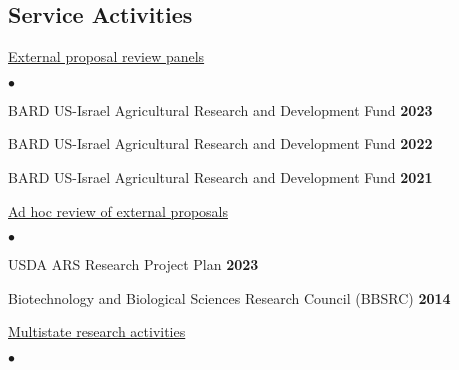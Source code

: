 \documentclass[margin,line,10pt]{res}
\newenvironment{list2}{
  \begin{list}{$\bullet$}{%
      \setlength{\itemsep}{0in}
      \setlength{\parsep}{0in} \setlength{\parskip}{0in}
      \setlength{\topsep}{0in} \setlength{\partopsep}{0in} 
      \setlength{\leftmargin}{0.2in}}}{\end{list}}
\begin{document}
\begin{resume}
\vspace{0.5cm}
\section{\sc Service Activities}


\begin{flushleft}
  \hspace{0.3cm} \underline{External proposal review panels}
  \end{flushleft}


  \begin{list2}
    \item BARD US-Israel Agricultural Research and Development Fund \hfill \textbf{2023}  \\
  
    \vspace{0.3cm}

    \item BARD US-Israel Agricultural Research and Development Fund \hfill \textbf{2022}  \\
  
    \vspace{0.3cm}

    \item BARD US-Israel Agricultural Research and Development Fund \hfill \textbf{2021}  \\
  
    \end{list2}



\begin{flushleft}
\hspace{0.3cm} \underline{Ad hoc review of external proposals}
\end{flushleft}

\begin{list2}

  \item USDA ARS Research Project Plan \hfill \textbf{2023}  \\

  \vspace{0.3cm}

\item  Biotechnology and Biological Sciences Research Council (BBSRC) \hfill \textbf{2014}  \\
\end{list2}




\begin{flushleft}
\hspace{0.3cm} \underline{Multistate research activities}
\end{flushleft}
\begin{list2}


\end{list2}
\end{resume}
\end{document}
